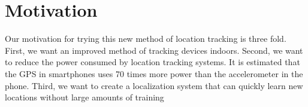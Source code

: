 \section{Motivation}
\label{sec:motivation}

Our motivation for trying this new method of location tracking is three fold. 
First, we want an improved method of tracking devices indoors.
Second, we want to reduce the power consumed by location tracking systems.
It is estimated that the GPS in smartphones uses 70 times more power than the accelerometer in the phone.
Third, we want to create a localization system that can quickly learn new locations without large amounts of training